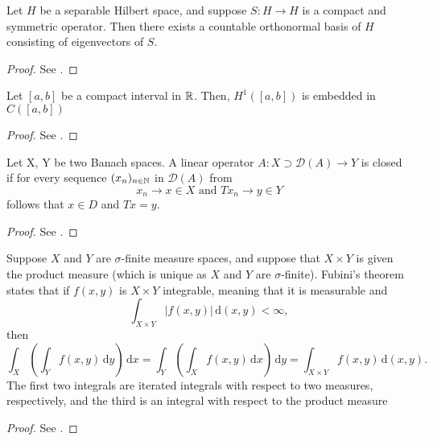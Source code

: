 \begin{atheorem}
	Let $H$ be a separable Hilbert space, and suppose $S \colon H \rightarrow H$ is a compact and symmetric operator. Then there exists a countable orthonormal basis of $H$ consisting of eigenvectors of $S$.
	
	\begin{proof}
		See \cite[p. 645]{evans1998partial}.
	\end{proof}
\end{atheorem}

\begin{atheorem}[Embedding of $H^{1}$ in $C$]
	Let $[a, b]$ be a compact interval in $\mathbb{R}$. Then, $H^{1}([a, b])$ is embedded in $C([a, b])$
	
	\begin{proof}
		See \cite[p. 266seq]{evans1998partial}.
	\end{proof}
\end{atheorem}

\begin{atheorem}
	Let X, Y be two Banach spaces. A linear operator $A \colon X \supset \mathcal{D}(A)  \rightarrow Y$ is closed if for every sequence $(x_n)_{n \in \mathbb{N}}$ in $\mathcal{D}(A)$ from
	\[ x_{n} \rightarrow x \in X \text{ and } Tx_{n} \rightarrow y \in Y \]
	follows that $x \in D$ and $Tx = y$.

	\begin{proof}
		 See \cite[p. 156]{werner2006funkana}.
	\end{proof}
\end{atheorem}	

\begin{atheorem}
	Suppose $X$ and $Y$ are $\sigma$-finite measure spaces, and suppose that $X \times Y$ is given the product measure (which is unique as $X$ and $Y$ are $\sigma$-finite). Fubini's theorem states that if $f(x,y)$ is $X \times Y$ integrable, meaning that it is measurable and
		\[  \int_{X\times Y} |f(x,y)|\,\text{d}(x,y)<\infty, \]
	then
		\[ \int_X\left(\int_Y f(x,y)\,\text{d}y\right)\,\text{d}x=\int_Y\left(\int_X f(x,y)\,\text{d}x\right)\,\text{d}y=\int_{X\times Y} f(x,y)\,\text{d}(x,y). \]
	The first two integrals are iterated integrals with respect to two measures, respectively, and the third is an integral with respect to the product measure

	\begin{proof}
		See \cite[p. 514]{werner2006funkana}.
	\end{proof}
\end{atheorem}

